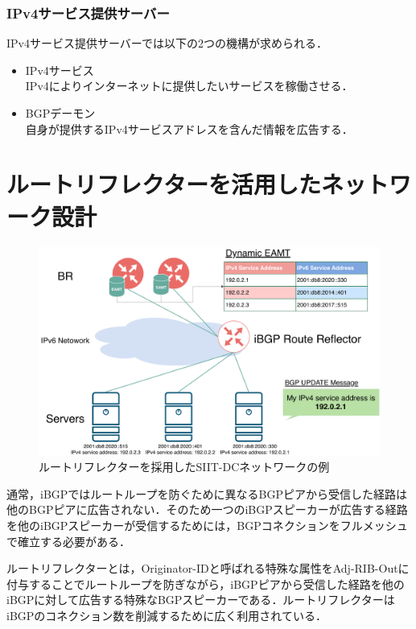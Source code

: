 \subsubsection{IPv4サービス提供サーバー}
IPv4サービス提供サーバーでは以下の2つの機構が求められる．
\begin{itemize}
    \item IPv4サービス\\
    IPv4によりインターネットに提供したいサービスを稼働させる．
    \item BGPデーモン\\
    自身が提供するIPv4サービスアドレスを含んだ情報を広告する．
\end{itemize}


\section{ルートリフレクターを活用したネットワーク設計}

\begin{figure}[h]
    \begin{center}
    \includegraphics[width=15cm,pagebox=cropbox,clip]{img/proposal_method_network_rr.pdf}
    \end{center}
    \caption{ルートリフレクターを採用したSIIT-DCネットワークの例}
    \label{fig:proposal_method_network_rr}
\end{figure}

通常，iBGPではルートループを防ぐために異なるBGPピアから受信した経路は他のBGPピアに広告されない．そのため一つのiBGPスピーカーが広告する経路を他のiBGPスピーカーが受信するためには，BGPコネクションをフルメッシュで確立する必要がある\cite{vutukuru2005construct}．

ルートリフレクターとは，Originator-IDと呼ばれる特殊な属性をAdj-RIB-Outに付与することでルートループを防ぎながら，iBGPピアから受信した経路を他のiBGPに対して広告する特殊なBGPスピーカーである\cite{RFC4456}．ルートリフレクターはiBGPのコネクション数を削減するために広く利用されている．

